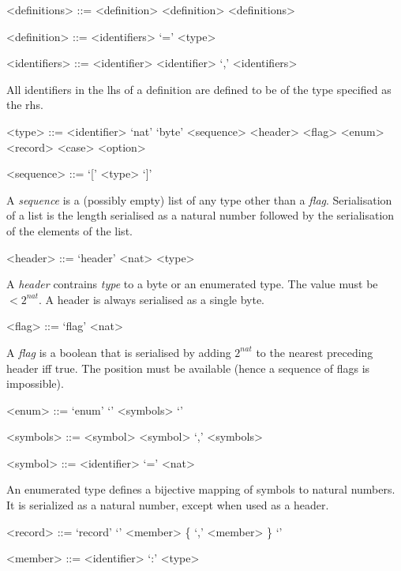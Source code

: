 \documentclass[a4paper,oneside,article]{memoir}
\begin{document}
\begin{grammar}
  <definitions> ::= <definition> \alt <definition> <definitions>
  
  <definition> ::= <identifiers> `=' <type>

  <identifiers> ::= <identifier> \alt <identifier> `,' <identifiers>
\end{grammar}

All identifiers in the lhs of a definition are defined to be of the type specified as the rhs.

\begin{grammar}
  <type> ::= <identifier> \alt `nat' \alt `byte' \alt <sequence> \alt <header> \alt <flag> \alt <enum> \alt <record> \alt <case> \alt <option>

  <sequence> ::= `[' <type> `]'
\end{grammar}

A \emph{sequence} is a (possibly empty) list of any type other than a \emph{flag}. Serialisation of
a list is the length serialised as a natural number followed by the serialisation of the elements of
the list.

\begin{grammar}
  <header> ::= `header' <nat> <type>
\end{grammar}

A \emph{header} contrains \emph{type} to a byte or an enumerated type.  The value must be
$< 2^{nat}$.  A header is always serialised as a single byte.

\begin{grammar}
  <flag> ::= `flag' <nat>
\end{grammar}

A \emph{flag} is a boolean that is serialised by adding $2^{nat}$ to the nearest preceding header
iff true.  The position must be available (hence a sequence of flags is impossible).

\begin{grammar}
  <enum> ::= `enum' `{' <symbols> `}'

  <symbols> ::= <symbol> \alt <symbol> `,' <symbols>
  
  <symbol> ::= <identifier> `=' <nat>
\end{grammar}

An enumerated type defines a bijective mapping of symbols to natural numbers.  It is serialized as a
natural number, except when used as a header.
  
\begin{grammar}
  <record> ::= `record' `{' <member> \{ `,' <member> \} `}'

  <member> ::= <identifier> `:' <type>
\end{grammar}
\end{document}
